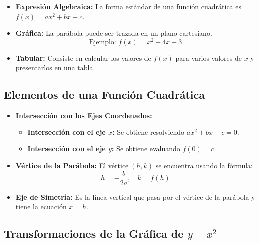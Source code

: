     \begin{itemize}
        \item \textbf{Expresión Algebraica:} La forma estándar de una función cuadrática es \(f(x) = ax^2 + bx + c\).
        
        \item \textbf{Gráfica:} La parábola puede ser trazada en un plano cartesiano. 
        \[
        \text{Ejemplo: } f(x) = x^2 - 4x + 3
        \]
        
        \item \textbf{Tabular:} Consiste en calcular los valores de \(f(x)\) para varios valores de \(x\) y presentarlos en una tabla.
    \end{itemize}
    
    \subsection{Elementos de una Función Cuadrática}
    
    \begin{itemize}
        \item \textbf{Intersección con los Ejes Coordenados:}
        \begin{itemize}
            \item \textbf{Intersección con el eje \(x\):} Se obtiene resolviendo \(ax^2 + bx + c = 0\).
            \item \textbf{Intersección con el eje \(y\):} Se obtiene evaluando \(f(0) = c\).
        \end{itemize}
        
        \item \textbf{Vértice de la Parábola:} El vértice \((h, k)\) se encuentra usando la fórmula:
        \[
        h = -\frac{b}{2a}, \quad k = f(h)
        \]
        
        \item \textbf{Eje de Simetría:} Es la línea vertical que pasa por el vértice de la parábola y tiene la ecuación \(x = h\).
    \end{itemize}
    
    \subsection{Transformaciones de la Gráfica de \(y = x^2\)}
    
